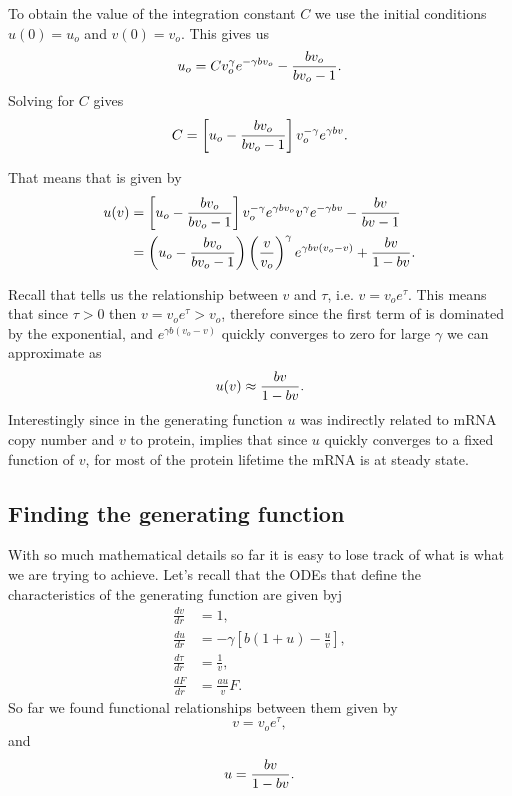 To obtain the value of the integration constant $C$ we use the initial
conditions $u(0) = u_o$ and $v(0) = v_o$. This gives us
\begin{equation}
  u_o = C v_o^{\gamma} e^{-\gamma b v_o}
  - {b v_o \over b v_o - 1}.
\end{equation}
Solving for $C$ gives
\begin{equation}
  C = \left[ u_o - {b v_o \over b v_o - 1} \right] v_o^{-\gamma} e^{\gamma b v}.
\end{equation}

That means that  is given by
\begin{align}
  u(v) &= \left[ u_o - {b v_o \over b v_o - 1} \right]
  v_o^{-\gamma} e^{\gamma b v_o} v^{\gamma} e^{-\gamma b v}
  - {b v \over b v - 1}\\
  &= \left( u_o - {b v_o \over b v_o - 1}  \right)
  \left( {v \over v_o} \right)^{\gamma}
  e^{\gamma b v (v_o - v)}
  + {b v \over 1 - b v}.
  \label{eq_uofv_with_C}
\end{align}

Recall that  tells us the relationship between $v$ and
$\tau$, i.e. $v = v_o e^{\tau}$. This means that since $\tau > 0$ then
$v = v_o e^{\tau} > v_o$, therefore since the first term of
 is dominated by the exponential, and
$e^{\gamma b (v_o - v)}$ quickly converges to zero for large $\gamma$ we can
approximate  as
\begin{equation}
  u(v) \approx {b v \over 1 - b v}.
  \label{eq_SI_31_uofv}
\end{equation}
Interestingly since in the generating function 
$u$ was indirectly related to mRNA copy number and $v$ to protein,
 implies that since $u$ quickly converges to a fixed
function of $v$, for most of the protein lifetime the mRNA is at steady state.

\subsection{Finding the generating function}

With so much mathematical details so far it is easy to lose track of what is
what we are trying to achieve. Let's recall that the ODEs that define the
characteristics of the generating function are given byj
\begin{align}
  \frac{d v}{d r} &= 1,
  \\
  \frac{d u}{d r} &= - \gamma \left[ b (1 + u) - \frac{u}{v}
  \right],
  \\
  \frac{d \tau}{d r} &= \frac{1}{v},
  \\
  \frac{d F}{d r} &= \frac{a u}{v} F.
\end{align}
So far we found functional relationships between them given by
\begin{equation}
  v = v_o e^{\tau},
\end{equation}
and
\begin{equation}
  u = {b v \over 1 - b v}.
\end{equation}

